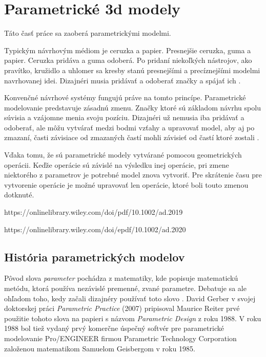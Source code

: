 \chapter{Parametrické 3d modely}
Táto časť práce sa zaoberá parametrickými modelmi. 

Typickým návrhovým médiom je ceruzka a papier. Presnejšie ceruzka, guma a papier. Ceruzka pridáva a guma odoberá. Po pridaní niekoľkých nástrojov, ako pravítko, kružidlo a uhlomer sa kresby stanú presnejšími a precíznejšími modelmi navrhovanej idei. Dizajnéri musia pridávať a odoberať značky a spájať ich \cite{woodbury2010elements}.

Konvenčné návrhové systémy fungujú práve na tomto princípe. Parametrické modelovanie predstavuje zásadnú zmenu. Značky ktoré sú základom návrhu spolu súvisia a vzájomne menia svoju pozíciu. Dizajnéri už nemusia iba pridávať a odoberať, ale môžu vytvárať medzi bodmi vzťahy a upravovať model, aby aj po zmazaní, časti závisiace od zmazaných častí mohli závisieť od častí ktoré zostali \cite{woodbury2010elements}. 

Vďaka tomu, že sú parametrické modely vytvárané pomocou geometrických operácii. Keďže operácie sú závislé na výsledku inej operácie, pri zmene niektorého z parametrov je potrebné model znova vytvoriť. Pre skrátenie času pre vytvorenie operácie je možné upravovať len operácie, ktoré boli touto zmenou dotknuté.



https://onlinelibrary.wiley.com/doi/pdf/10.1002/ad.2019

https://onlinelibrary.wiley.com/doi/epdf/10.1002/ad.2020





\section{História parametrických modelov}
Pôvod slova \textit{parameter} pochádza z matematiky, kde popisuje matematickú metódu, ktorá používa nezávislé premenné, zvané parametre. Debatuje sa ale ohľadom toho, kedy začali dizajnéry používať toto slovo \cite{davis_2013}. David Gerber v svojej doktorskej práci \textit{Parametric Practice} (2007) pripisoval Maurice Reiter prvé použitie tohoto slova na papieri s názvom \textit{Parametric Design} z roku 1988. V roku 1988 bol tiež vydaný prvý komerčne úspečný softvér pre parametrické modelovanie \textsf{Pro/ENGINEER} firmou Parametric Technology Corporation založenou matematikom Samuelom Geisbergom v roku 1985.

